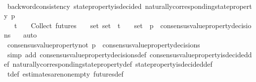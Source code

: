\begin{isabellebody}
\ \ \ \ \ \ \isanewline
\ \ \ \ \ \ \isamarkupfalse%
\ backword{\isacharunderscore}consistency\ {\isacartoucheopen}state{\isacharunderscore}property{\isacharunderscore}is{\isacharunderscore}decided\ {\isacharparenleft}naturally{\isacharunderscore}corresponding{\isacharunderscore}state{\isacharunderscore}property\ p{\isacharcomma}\ {\isasymsigma}{\isacharprime}{\isacharprime}{\isacharparenright}{\isacartoucheclose}\isanewline
\ \ \ \ \ \ \isamarkupfalse%
\ {\isacartoucheopen}{\isasymsigma}{\isacharprime}{\isacharprime}\ {\isasymin}\ {\isasymSigma}t\ {\isasymand}\ {\isasymsigma}{\isacharprime}{\isacharprime}\ {\isasymin}\ {\isasymInter}{\isacharunderscore}Collect\ {\isacharparenleft}futures\ {\isasymsigma}{\isacharparenright}\ {\isacharparenleft}{\isasymsigma}\ {\isasymin}\ {\isasymsigma}{\isacharunderscore}set{\isacharparenright}{\isacartoucheclose}\ {\isacartoucheopen}{\isasymsigma}{\isacharunderscore}set\ {\isasymsubseteq}\ {\isasymSigma}t{\isacartoucheclose}\ {\isacartoucheopen}{\isacharbraceleft}{\isasymsigma}{\isacharcomma}\ {\isasymsigma}{\isacharprime}{\isacharbraceright}\ {\isasymsubseteq}\ {\isasymsigma}{\isacharunderscore}set\ {\isasymand}\ p\ {\isasymin}\ consensus{\isacharunderscore}value{\isacharunderscore}property{\isacharunderscore}decisions\ {\isasymsigma}{\isacartoucheclose}\ \isamarkupfalse%
\ auto\ \ \isanewline
\ \ \isamarkupfalse%
\ \isamarkupfalse%
\ {\isachardoublequoteopen}consensus{\isacharunderscore}value{\isacharunderscore}property{\isacharunderscore}not\ p\ {\isasymnotin}\ consensus{\isacharunderscore}value{\isacharunderscore}property{\isacharunderscore}decisions\ {\isasymsigma}{\isacharprime}{\isachardoublequoteclose}\isanewline
\ \ \ \ \isamarkupfalse%
\ {\isacharparenleft}simp\ add{\isacharcolon}\ consensus{\isacharunderscore}value{\isacharunderscore}property{\isacharunderscore}decisions{\isacharunderscore}def\ consensus{\isacharunderscore}value{\isacharunderscore}property{\isacharunderscore}is{\isacharunderscore}decided{\isacharunderscore}def\ naturally{\isacharunderscore}corresponding{\isacharunderscore}state{\isacharunderscore}property{\isacharunderscore}def\ state{\isacharunderscore}property{\isacharunderscore}is{\isacharunderscore}decided{\isacharunderscore}def{\isacharparenright}\isanewline
\ \ \ \ \isamarkupfalse%
\ {\isasymSigma}t{\isacharunderscore}def\ estimates{\isacharunderscore}are{\isacharunderscore}non{\isacharunderscore}empty\ futures{\isacharunderscore}def\ \isamarkupfalse%

\end{isabellebody}
